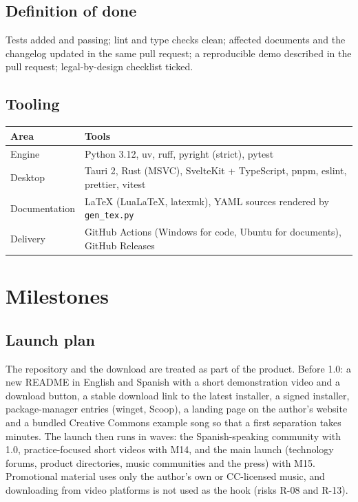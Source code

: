 \documentclass{covermaker}
\begin{document}
\section{Definition of done}
Tests added and passing; lint and type checks clean; affected documents and the
changelog updated in the same pull request; a reproducible demo described in the
pull request; legal-by-design checklist ticked.

\section{Tooling}
\begin{tabularx}{\linewidth}{@{}lY@{}}
\toprule
\textbf{Area} & \textbf{Tools} \\
\midrule
Engine & Python 3.12, uv, ruff, pyright (strict), pytest \\
Desktop & Tauri 2, Rust (MSVC), SvelteKit + TypeScript, pnpm, eslint, prettier, vitest \\
Documentation & LaTeX (LuaLaTeX, latexmk), YAML sources rendered by \texttt{gen\_tex.py} \\
Delivery & GitHub Actions (Windows for code, Ubuntu for documents), GitHub Releases \\
\bottomrule
\end{tabularx}

\chapter{Milestones}\label{ch:milestones}


\section{Launch plan}
The repository and the download are treated as part of the product. Before
1.0: a new README in English and Spanish with a short demonstration video and a
download button, a stable download link to the latest installer, a signed
installer, package-manager entries (winget, Scoop), a landing page on the
author's website and a bundled Creative Commons example song so that a first
separation takes minutes. The launch then runs in waves: the Spanish-speaking
community with 1.0, practice-focused short videos with M14, and the main launch
(technology forums, product directories, music communities and the press) with
M15. Promotional material uses only the author's own or CC-licensed music, and
downloading from video platforms is not used as the hook (risks R-08 and
R-13).
\end{document}
